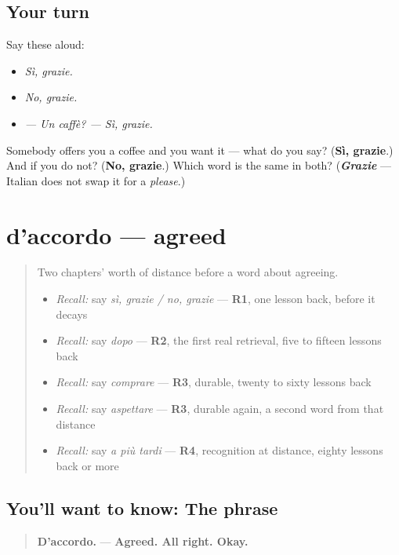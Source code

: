 \subsection*{Your turn}
Say these aloud:

\begin{itemize}
\raggedright
  \item \emph{Sì, grazie.}
  \item \emph{No, grazie.}
  \item \emph{— Un caffè? — Sì, grazie.}
\end{itemize}

\begin{tcolorbox}[breakable,colback=teal!4,colframe=teal!35!black,title={Before you move on}]
Somebody offers you a coffee and you want it — what do you say? (\textbf{Sì, grazie}.) And if you do not? (\textbf{No, grazie}.) Which word is the same in both? (\emph{\textbf{Grazie}} — Italian does not swap it for a \emph{please}.)
\end{tcolorbox}
\section[d'accordo]{d'accordo — agreed}

\label{lesson:IT-C29-daccordo}



\begin{quote}
Two chapters' worth of distance before a word about agreeing.

\begin{itemize}
\raggedright
  \item \emph{Recall:} say \emph{sì, grazie / no, grazie} — \textbf{R1}, one lesson back, before it decays
  \item \emph{Recall:} say \emph{dopo} — \textbf{R2}, the first real retrieval, five to fifteen lessons back
  \item \emph{Recall:} say \emph{comprare} — \textbf{R3}, durable, twenty to sixty lessons back
  \item \emph{Recall:} say \emph{aspettare} — \textbf{R3}, durable again, a second word from that distance
  \item \emph{Recall:} say \emph{a più tardi} — \textbf{R4}, recognition at distance, eighty lessons back or more
\end{itemize}
\end{quote}

\subsection*{You'll want to know: The phrase}
\begin{quote}
\textbf{D'accordo.} — \textbf{Agreed. All right. Okay.}
\end{quote}

